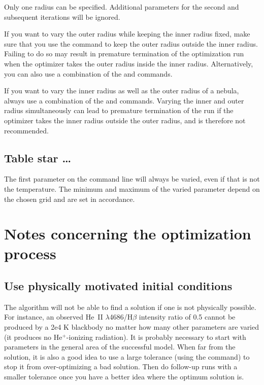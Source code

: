 Only one radius can be specified. Additional parameters for the second and
subsequent iterations will be ignored.

If you want to vary the outer radius while keeping the inner radius fixed,
make sure that you use the  command to keep the
outer radius outside the inner radius. Failing to do so may result in
premature termination of the optimization run when the optimizer takes the
outer radius inside the inner radius. Alternatively, you can also use a
combination of the  and  commands.

If you want to vary the inner radius as well as the outer radius of a nebula,
always use a combination of the  and  commands. Varying the inner and outer radius simultaneously can
lead to premature termination of the run if the optimizer takes the inner
radius outside the outer radius, and is therefore not recommended.

\subsection{Table star \ldots}

The first parameter on the command line will always be varied, even if that is
not the temperature.
The minimum and maximum of the varied parameter depend on the chosen grid and
are set in accordance.

\section{Notes concerning the optimization process}

\subsection{Use physically motivated initial conditions}

The algorithm will not be able to find a solution if one is not physically
possible.
For instance, an observed He~II $\lambda $4686/H$\beta$ intensity
ratio of 0.5
cannot be produced by a 2e4 K blackbody no matter how many other
parameters are varied (it produces no He$^+$-ionizing radiation).
It is
probably necessary to start with parameters in the general area of the
successful model.
When far from the solution, it is also a good idea to
use a large tolerance (using the  command)
to stop it
from over-optimizing a bad solution. Then do follow-up runs with a smaller
tolerance once you have a better idea where the optimum solution is.

